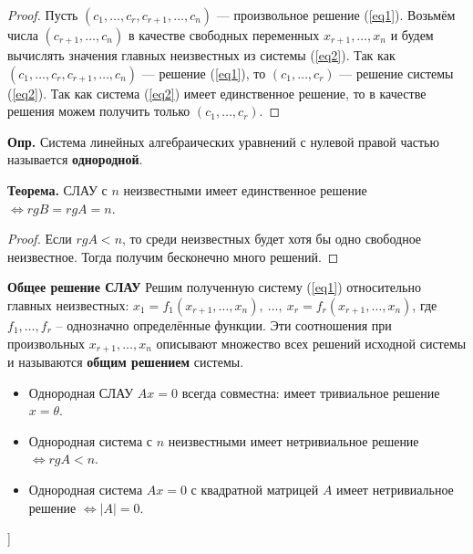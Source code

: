\begin{proof} Пусть $(c_1, \dots, c_r, c_{r+1}, \dots, c_n)$ --- произвольное решение (\ref{eq1}). Возьмём числа $(c_{r+1}, \dots, c_n)$ в качестве свободных переменных $x_{r+1}, \dots, x_n$ и будем вычислять значения главных неизвестных из системы (\ref{eq2}). Так как $(c_1, \dots, c_r, c_{r+1}, \dots, c_n)$ --- решение (\ref{eq1}), то $(c_1, \dots, c_r)$ --- решение системы (\ref{eq2}). Так как система (\ref{eq2}) имеет единственное решение, то в качестве решения можем получить только $(c_1, \dots, c_r)$. 
\end{proof}

\textbf{Опр.} Система линейных алгебраических уравнений с нулевой правой частью называется \textbf{однородной}.

\textbf{Теорема.} СЛАУ с $n$ неизвестными имеет единственное решение $\iff rgB = rgA = n$.

\begin{proof} Если $rgA < n$, то среди неизвестных будет хотя бы одно свободное неизвестное. Тогда получим бесконечно много решений. 
\end{proof}

\textbf{Общее решение СЛАУ}
Решим полученную систему (\ref{eq1}) относительно главных неизвестных: $x_1 = f_1(x_{r+1}, \dots, x_n), ~ \dots, ~ x_r = f_r(x_{r+1}, \dots, x_n)$, где $f_1, \dots, f_r$ -- однозначно определённые функции. Эти соотношения при произвольных $x_{r+1}, \dots, x_n$ описывают множество всех решений исходной системы и называются \textbf{общим решением} системы.
 
 
\bigbreak
\begin{itemize}
    \item Однородная СЛАУ $Ax = 0$ всегда совместна: имеет тривиальное решение $x = \theta$.
    \item Однородная система с $n$ неизвестными имеет нетривиальное решение $\iff rgA < n$.
    \item Однородная система $Ax = 0$ с квадратной матрицей $A$ имеет нетривиальное решение $\iff |A| = 0$.
\end{itemize}






\bigbreak
[\cite[page 104-109]{kim}]